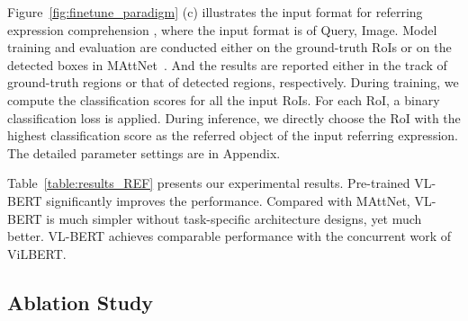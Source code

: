 \documentclass{article} \usepackage{iclr2020_conference,times}
\begin{document}
Figure~\ref{fig:finetune_paradigm} (c) illustrates the input format for referring expression comprehension , where the input format is of Query, Image. Model training and evaluation are conducted either on the ground-truth RoIs or on the detected boxes in MAttNet~\citep{yu2018mattnet}. And the results are reported either in the track of ground-truth regions or that of detected regions, respectively. During training, we compute the classification scores for all the input RoIs. For each RoI, a binary classification loss is applied. During inference, we directly choose the RoI with the highest classification score as the referred object of the input referring expression. The detailed parameter settings are in Appendix.


Table~\ref{table:results_REF} presents our experimental results. 
Pre-trained VL-BERT significantly improves the performance. Compared with MAttNet, VL-BERT is much simpler without task-specific architecture designs, yet much better. VL-BERT achieves comparable performance with the concurrent work of ViLBERT.

\subsection{Ablation Study}
\label{sec:ablation}
\end{document}
